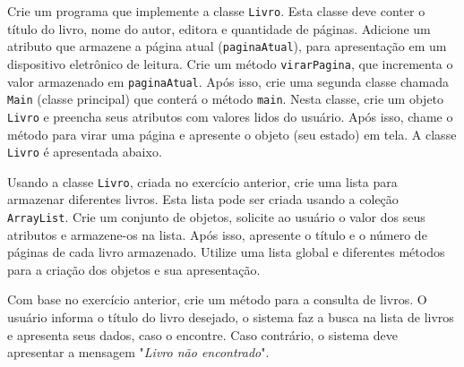 \begin{exercise}[CadLivro]
Crie um programa que implemente a classe \texttt{Livro}. Esta classe deve conter o título do livro, nome do autor, editora e quantidade de páginas. Adicione um atributo que armazene a página atual (\texttt{paginaAtual}), para apresentação em um dispositivo eletrônico de leitura. Crie um método \texttt{virarPagina}, que incrementa o valor armazenado em \texttt{paginaAtual}. Após isso, crie uma segunda classe chamada \texttt{Main} (classe principal) que conterá o método \texttt{main}. Nesta classe, crie um objeto \texttt{Livro} e preencha seus atributos com valores lidos do usuário. Após isso, chame o método para virar uma página e apresente o objeto (seu estado) em tela. A classe \texttt{Livro} é apresentada abaixo.

\begin{figure}[h]
	\centering
\end{figure}

\end{exercise}

\begin{exercise}[ListaLivros]
Usando a classe \texttt{Livro}, criada no exercício anterior, crie uma lista para armazenar diferentes livros. Esta lista pode ser criada usando a coleção \texttt{ArrayList}. Crie um conjunto de objetos, solicite ao usuário o valor dos seus atributos e armazene-os na lista. Após isso, apresente o título e o número de páginas de cada livro armazenado. Utilize uma lista global e diferentes métodos para a criação dos objetos e sua apresentação.
\end{exercise}

\begin{exercise}[ConsultaLivro]
Com base no exercício anterior, crie um método para a consulta de livros. O usuário informa o título do livro desejado, o sistema faz a busca na lista de livros e apresenta seus dados, caso o encontre. Caso contrário, o sistema deve apresentar a mensagem "\textit{Livro não encontrado}".
\end{exercise}

